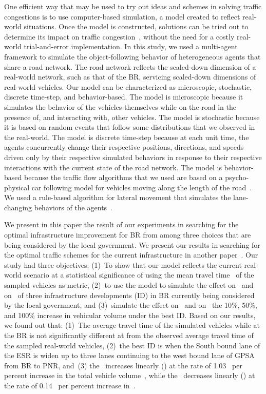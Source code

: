 \documentclass[preprint]{./acm_proc_article-sp}
\begin{document}
One efficient way that may be used to try out ideas and schemes in solving traffic congestions is to use computer-based simulation, a model created to reflect real-world situations. Once the model is constructed, solutions can be tried out to determine its impact on traffic congestion~\citep{bared02}, without the need for a costly real-world trial-and-error implementation. In this study, we used a multi-agent framework to simulate the object-following behavior of heterogeneous agents that share a road network. The road network reflects the scaled-down dimension of a real-world network, such as that of the BR, servicing scaled-down dimensions of real-world vehicles. Our model can be characterized as microscopic, stochastic, discrete time-step, and behavior-based. The model is microscopic because it simulates the behavior of the vehicles themselves while on the road in the presence of, and interacting with, other vehicles. The model is stochastic because it is based on random events that follow some distributions that we observed in the real-world. The model is discrete time-step because at each unit time, the agents concurrently change their respective positions, directions, and speeds driven only by their respective simulated behaviors in response to their respective interactions with the current state of the road network. The model is behavior-based because the traffic flow algorithms that we used are based on a psycho-physical car following model for vehicles moving along the length of the road~\citep{fritzsche94,gipps81}. We used a rule-based algorithm for lateral movement that simulates the lane-changing behaviors of the agents~\citep{alshihabi03,VISSIM90}. 

We present in this paper the result of our experiments in searching for the optimal infrastructure improvement for BR from among three choices that are being considered by the local government. We  present our results in searching for the optimal traffic schemes for the current infrastructure in another paper~\citep{tataro13}. Our study had three objectives: (1)~To show that our model reflects the current real-world scenario at a statistical significance of  using the mean travel time~ of the sampled vehicles as metric, (2)~to use the model to simulate the effect on~ and on~ of three infrastructure developments (ID) in BR currently being considered by the local government, and (3)~simulate the effect on~ and on~ the 10\%, 50\%, and 100\% increase in vehicular volume under the best ID. Based on our results, we found out that: (1)~The average travel time of the simulated vehicles while at the BR is not significantly different at  from the observed average travel time of the sampled real-world vehicles, (2)~the best ID is when the South bound lane of the ESR is widen up to three lanes continuing to the west bound lane of GPSA from BR to PNR, and~(3) the~ increases linearly () at the rate of 1.03~ per percent increase in the total vehicle volume~, while the~ decreases linearly () at the rate of 0.14~ per percent increase in~.
\end{document}
